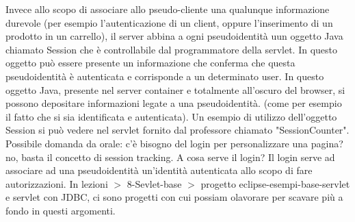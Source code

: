 Invece allo scopo di associare allo pseudo-cliente una qualunque informazione durevole (per esempio l'autenticazione di un client, oppure l'inserimento di un prodotto in un carrello), il server abbina a ogni pseudoidentità uun oggetto Java chiamato Session che è controllabile dal programmatore della servlet. In questo oggetto può essere presente un informazione che conferma che questa pseudoidentità è autenticata e corrisponde a un determinato user. In questo oggetto Java, presente nel server container e totalmente all'oscuro del browser, si possono depositare informazioni legate a una pseudoidentità. (come per esempio il fatto che si sia identificata e autenticata).\newline
Un esempio di utilizzo dell'oggetto Session si può vedere nel servlet fornito dal professore chiamato "SessionCounter".\newline
\newline
Possibile domanda da orale: c'è bisogno del login per personalizzare una pagina? no, basta il concetto di session tracking. A cosa serve il login? Il login serve ad associare ad una pseudoidentità un'identità autenticata allo scopo di fare autorizzazioni.\newline
\newline
In lezioni $>$ 8-Sevlet-base $>$ progetto eclipse-esempi-base-servlet e servlet con JDBC, ci sono progetti con cui possiam olavorare per scavare più a fondo in questi argomenti.